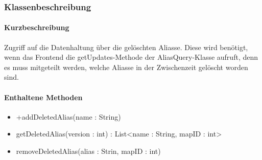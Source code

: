 \subsubsection*{Klassenbeschreibung}%
\paragraph*{Kurzbeschreibung}
Zugriff auf die Datenhaltung über die gelöschten Aliasse. Diese wird benötigt, wenn das Frontend die getUpdates-Methode der AliasQuery-Klasse aufruft, 
denn es muss mitgeteilt werden, welche Aliasse in der Zwischenzeit gelöscht worden sind.

\paragraph*{Enthaltene Methoden}
\begin{itemize}
    \item +addDeletedAlias(name : String)
    \item getDeletedAlias(version : int) : List<name : String, mapID : int>
    \item removeDeletedAlias(alias : Strin, mapID : int)
\end{itemize}
